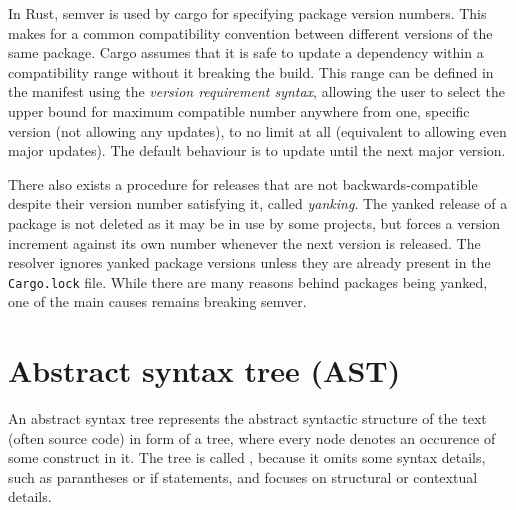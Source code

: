 \documentclass[licencjacka,en]{pracamgr}
\begin{document}
In Rust, semver is used by cargo for specifying package version numbers. This makes for a common
compatibility convention between different versions of the same package. Cargo assumes that
it is safe to update a dependency within a compatibility range without it breaking the build.
This range can be defined in the manifest using the \textit{version requirement syntax}, allowing
the user to select the upper bound for maximum compatible number anywhere from one, specific
version (not allowing any updates), to no limit at all (equivalent to allowing even major updates).
The default behaviour is to update until the next major version.


There also exists a procedure for releases that are not backwards-compatible despite their version
number satisfying it, called \textit{yanking}. The yanked release of a package is not
deleted as it may be in use by some projects, but forces a version increment against its own number
whenever the next version is released. The resolver ignores yanked package versions unless they are
already present in the \texttt{Cargo.lock} file. While there are many reasons behind packages being
yanked, one of the main causes remains breaking semver.

\section{Abstract syntax tree (AST)}\label{r:section_ast}

An abstract syntax tree represents the abstract syntactic structure of the text (often source code)
in form of a tree, where every node denotes an occurence of some construct in it. The tree is
called , because it omits some syntax details, such as parantheses or if statements,
and focuses on structural or contextual details.
\end{document}
